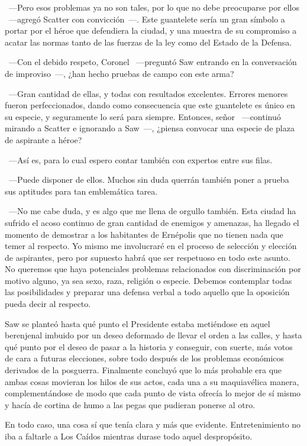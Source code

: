 ~---Pero esos problemas ya no son tales, por lo que no debe preocuparse por ellos ~---agregó Scatter con convicción~---. Este guantelete sería un gran símbolo a portar por el héroe que defendiera la ciudad, y una muestra de su compromiso a acatar las normas tanto de las fuerzas de la ley como del Estado de la Defensa.

~---Con el debido respeto, Coronel ~---preguntó Saw entrando en la conversación de improviso~---, ¿han hecho pruebas de campo con este arma?

~---Gran cantidad de ellas, y todas con resultados excelentes. Errores menores fueron perfeccionados, dando como consecuencia que este guantelete es único en su especie, y seguramente lo será para siempre. Entonces, señor ~---continuó mirando a Scatter e ignorando a Saw~---, ¿piensa convocar una especie de plaza de aspirante a héroe?

~---Así es, para lo cual espero contar también con expertos entre sus filas.

~---Puede disponer de ellos. Muchos sin duda querrán también poner a prueba sus aptitudes para tan emblemática tarea.

~---No me cabe duda, y es algo que me llena de orgullo también. Esta ciudad ha sufrido el acoso continuo de gran cantidad de enemigos y amenazas, ha llegado el momento de demostrar a los habitantes de Ernépolis que no tienen nada que temer al respecto. Yo mismo me involucraré en el proceso de selección y elección de aspirantes, pero por supuesto habrá que ser respetuoso en todo este asunto. No queremos que haya potenciales problemas relacionados con discriminación por motivo alguno, ya sea sexo, raza, religión o especie. Debemos contemplar todas las posibilidades y preparar una defensa verbal a todo aquello que la oposición pueda decir al respecto.

Saw se planteó hasta qué punto el Presidente estaba metiéndose en aquel berenjenal imbuido por un deseo deformado de llevar el orden a las calles, y hasta qué punto por el deseo de pasar a la historia y conseguir, con suerte, más votos de cara a futuras elecciones, sobre todo después de los problemas económicos derivados de la posguerra. Finalmente concluyó que lo más probable era que ambas cosas movieran los hilos de sus actos, cada una a su maquiavélica manera, complementándose de modo que cada punto de vista ofrecía lo mejor de sí mismo y hacía de cortina de humo a las pegas que pudieran ponerse al otro.

En todo caso, una cosa sí que tenía clara y más que evidente. Entretenimiento no iba a faltarle a Los Caídos mientras durase todo aquel despropósito.

